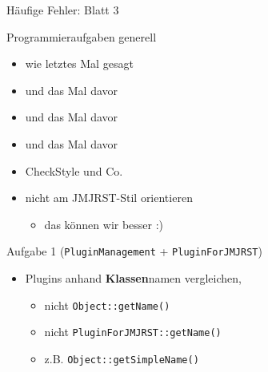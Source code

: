 \documentclass[18pt]{beamer}
\begin{document}
\begin{frame}{Häufige Fehler: Blatt 3}
\begin{block}{Programmieraufgaben generell}
	\begin{itemize}
		\item wie letztes Mal gesagt \pause
		\item und das Mal davor \pause
		\item und das Mal davor \pause
		\item und das Mal davor \pause
		\item CheckStyle und Co.
		\pause
		\item nicht am JMJRST-Stil orientieren
		\begin{itemize}
			\item das können wir besser :)
		\end{itemize}
	\end{itemize}
\end{block} 

\begin{block}{Aufgabe 1 (\texttt{PluginManagement} + \texttt{PluginForJMJRST})}
\begin{itemize}
	\pause
	\item Plugins anhand \textbf{Klassen}namen vergleichen, 
	\begin{itemize}
		\item nicht \texttt{Object::getName()}
		\item nicht \texttt{PluginForJMJRST::getName()}
		\item z.B. \texttt{Object::getSimpleName()}
	\end{itemize}
\end{itemize}
\end{block}
\end{frame}
\end{document}
